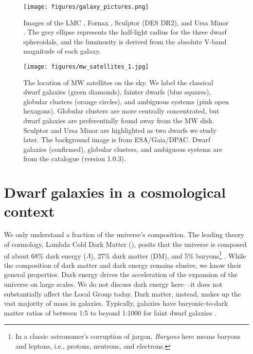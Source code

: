 \begin{figure}
\centering
\texttt{[image: figures/galaxy\_pictures.png]}
\caption[Images of dwarf galaxies]{Images\footnotemark{} of the LMC
\citep[Digitized Sky Survey II,][]{lasker+1996}, Fornax \citep[DES
DR2,][]{abbott+2021}, Sculptor (DES DR2), and Ursa Minor
\citep[UNWISE,][with \textit{Gaia} point sources
overplotted]{lang2014, meisner+lang+schlegel2017, meisner+lang+schlegel2017a}.
The grey ellipse represents the half-light radius for the three dwarf
spheroidals, and the luminosity is derived from the absolute V-band
magnitude of each galaxy.}\label{fig:galaxy_images}
\end{figure}

\begin{figure}
\centering
\texttt{[image: figures/mw\_satellites\_1.jpg]}
\caption[The on-sky distribution of Milky Way satellites]{The location
of MW satellites on the sky. We label the classical dwarf galaxies
(green diamonds), fainter dwarfs (blue squares), globular clusters
(orange circles), and ambiguous systems (pink open hexagons). Globular
clusters are more centrally concentrated, but dwarf galaxies are
preferentially found away from the MW disk. Sculptor and Ursa Minor are
highlighted as two dwarfs we study later. The background image is from
ESA/Gaia/DPAC.\footnotemark{} Dwarf galaxies (confirmed), globular
clusters, and ambiguous systems are from the \citet{pace2024} catalogue
(version 1.0.3).}\label{fig:mw_satellite_system}
\end{figure}

\section{Dwarf galaxies in a cosmological
context}\label{dwarf-galaxies-in-a-cosmological-context}

We only understand a fraction of the universe's composition. The leading
theory of cosmology, Lambda Cold Dark Matter (\LCDM{}), posits that the
universe is composed of about 68\% dark energy (\(\Lambda\)), 27\% dark
matter (DM), and 5\% baryons\footnote{In a classic astronomer's
  corruption of jargon, \emph{Baryons} here means baryons and leptons,
  i.e., protons, neutrons, and electrons.}
\citep{planckcollaboration+2020}. While the composition of dark matter
and dark energy remains elusive, we know their general properties. Dark
energy drives the acceleration of the expansion of the universe on large
scales. We do not discuss dark energy here---it does not substantially
affect the Local Group today. Dark matter, instead, makes up the vast
majority of mass in galaxies. Typically, galaxies have baryonic-to-dark
matter ratios of between 1:5 to beyond 1:1000 for faint dwarf galaxies
\citep[e.g.,][]{hayashi+2023}.

